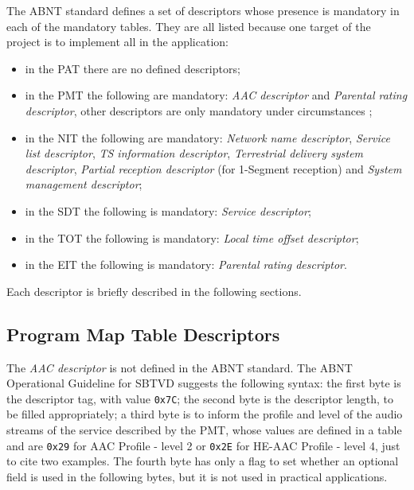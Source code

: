 \documentclass[
	12pt,				%
	openright,			%
	twoside,			%
	a4paper,			%
	brazil,
	french,				%
	english
	]{abntex2}
\begin{document}
The ABNT standard defines a set of descriptors whose presence is mandatory in each of the mandatory tables. They are all listed because one target of the project is to implement all in the application:

\begin{itemize}

\item in the PAT there are no defined descriptors;
\item in the PMT the following are mandatory: \textit{AAC descriptor} and \textit{Parental rating descriptor}, other descriptors are only mandatory under circumstances ;
\item in the NIT the following are mandatory: \textit{Network name descriptor}, \textit{Service list descriptor}, \textit{TS information descriptor}, \textit{Terrestrial delivery system descriptor}, \textit{Partial reception descriptor} (for 1-Segment reception) and \textit{System management descriptor};
\item in the SDT the following is mandatory: \textit{Service descriptor};
\item in the TOT the following is mandatory: \textit{Local time offset descriptor};
\item in the EIT the following is mandatory: \textit{Parental rating descriptor}.
\end{itemize}

Each descriptor is briefly described in the following sections.

\subsection{Program Map Table Descriptors}
\label{pmt_descriptors}
The \textit{AAC descriptor} is not defined in the ABNT standard. The ABNT Operational Guideline for SBTVD suggests the following syntax: the first byte is the descriptor tag, with value \texttt{0x7C}; the second byte is the descriptor length, to be filled appropriately; a third byte is to inform the profile and level of the audio streams of the service described by the PMT, whose values are defined in a table\cite{guia} and are \texttt{0x29} for AAC Profile - level 2 or \texttt{0x2E} for HE-AAC Profile - level 4, just to cite two examples. The fourth byte has only a flag to set whether an optional field is used in the following bytes, but it is not used in practical applications.
\end{document}
